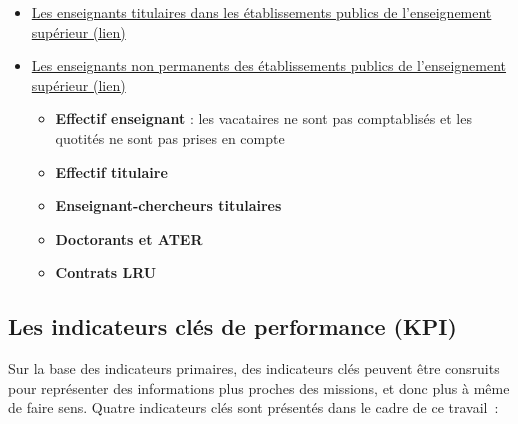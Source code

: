 \documentclass[11pt,french,landscape]{article}
\providecommand{\tightlist}{%
  \setlength{\itemsep}{0pt}\setlength{\parskip}{0pt}}
\begin{document}
\begin{multicols}{2}
\begin{itemize}
  \begin{itemize}
  \tightlist
  \item
    \textbf{Effectif étudiant} : Nombre d'étudiants inscrits
    (inscriptions principales) hors étudiants inscrits en parallèle en
    CPGE
  \item
    \textbf{Nombre d'inscriptions en Cycle 1 (L)} hors étudiants
    inscrits en parallèle en CPGE, inclu les DUT et autres formations
    post-bac
  \item
    \textbf{Nombre d'inscriptions en Cycle 2 (M)}
  \item
    \textbf{Nombre d'inscriptions en Cycle D (D)}
  \item
    \textbf{Nombre d'inscriptions en diplôme d'établissement} : par
    exemple diplôme d'université (DU)
  \end{itemize}
\item
  \href{https://data.enseignementsup-recherche.gouv.fr/explore/dataset/fr-esr-enseignants-titulaires-esr-public/}{Les
  enseignants titulaires dans les établissements publics de
  l'enseignement supérieur (lien)}
\item
  \href{https://data.enseignementsup-recherche.gouv.fr/explore/dataset/fr-esr-enseignants-nonpermanents-esr-public/}{Les
  enseignants non permanents des établissements publics de
  l'enseignement supérieur (lien)}

  \begin{itemize}
  \tightlist
  \item
    \textbf{Effectif enseignant} : les vacataires ne sont pas
    comptablisés et les quotités ne sont pas prises en compte
  \item
    \textbf{Effectif titulaire}
  \item
    \textbf{Enseignant-chercheurs titulaires}
  \item
    \textbf{Doctorants et ATER}
  \item
    \textbf{Contrats LRU}
  \end{itemize}
\end{itemize}

\hypertarget{les-indicateurs-cluxe9s-de-performance-kpi}{%
\subsection{Les indicateurs clés de performance
(KPI)}\label{les-indicateurs-cluxe9s-de-performance-kpi}}

Sur la base des indicateurs primaires, des indicateurs clés peuvent être
consruits pour représenter des informations plus proches des missions,
et donc plus à même de faire sens. Quatre indicateurs clés sont
présentés dans le cadre de ce travail~:


\end{multicols}
\end{document}
